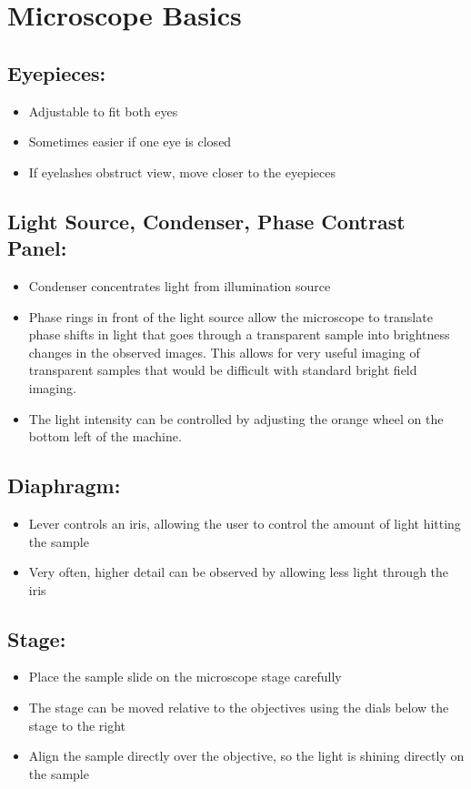 \chapter{Microscope Basics}
\thispagestyle{fancy}

\section*{Eyepieces:}
\begin{itemize}
	\setlength\itemsep{1pt}
	\item Adjustable to fit both eyes
	\item Sometimes easier if one eye is closed
	\item If eyelashes obstruct view, move closer to the eyepieces
\end{itemize}

\section*{Light Source, Condenser, Phase Contrast Panel:}
\begin{itemize}
	\setlength\itemsep{1pt}
	\item Condenser concentrates light from illumination source
	\item Phase rings in front of the light source allow the microscope to translate phase shifts in light that goes through a transparent sample into brightness changes in the observed images. This allows for very useful imaging of transparent samples that would be difficult with standard bright field imaging.
	\item The light intensity can be controlled by adjusting the orange wheel on the bottom left of the machine.
\end{itemize}

\section*{Diaphragm:}
\begin{itemize}
	\setlength\itemsep{1pt}
	\item Lever controls an iris, allowing the user to control the amount of light hitting the sample
	\item Very often, higher detail can be observed by allowing less light through the iris
\end{itemize}

\section*{Stage:}
\begin{itemize}
	\setlength\itemsep{1pt}
	\item Place the sample slide on the microscope stage carefully
	\item The stage can be moved relative to the objectives using the dials below the stage to the right
	\item Align the sample directly over the objective, so the light is shining directly on the sample
\end{itemize}

